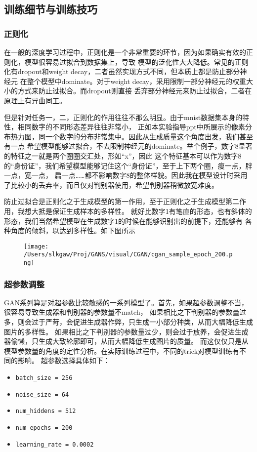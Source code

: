 \documentclass[12pt, a4paper]{article}
\begin{document}
\subsection{训练细节与训练技巧}
\subsubsection{正则化}
在一般的深度学习过程中，正则化是一个非常重要的环节，因为如果确实有效的正则化，模型很容易过拟合到数据集上，导致
模型的泛化性大大降低。常见的正则化有dropout和weight decay，二者虽然实现方式不同，但本质上都是防止部分神经元
在整个模型中dominate。对于weight decay，采用限制一部分神经元的权重大小的方式来防止过拟合。而dropout则直接
丢弃部分神经元来防止过拟合，二者在原理上有异曲同工。

但是针对任务一，二，正则化的作用往往不那么明显。由于mnist数据集本身的特性，相同数字的不同形态差异往往非常小，
正如本实验指导ppt中所展示的像素分布热力图，同一个数字的分布非常集中。因此从生成质量这个角度出发，我们甚至有一点
希望模型能够过拟合，不去限制神经元的dominate。举个例子，数字8显著的特征之一就是两个圈圈交汇处，形如“x”，因此
这个特征基本可以作为数字8的“身份证”，我们希望模型能够记住这个“身份证”，至于上下两个圈，瘦一点，胖一点，宽一点，
扁一点……都不影响数字8的整体样貌。因此我在模型设计时采用了比较小的丢弃率，而且仅对判别器使用，希望判别器稍微放宽难度。

防止过拟合是正则化之于生成模型的第一作用，至于正则化之于生成模型第二作用，我想大抵是保证生成样本的多样性。
就好比数字1有笔直的形态，也有斜体的形态，我们当然希望模型在生成数字1的时候在能够识别出的前提下，还能够有
各种角度的倾斜，以达到多样性。如下图所示

\vspace{1cm}


\begin{figure}[htbp]
    \centering
    \texttt{[image: /Users/slkgaw/Proj/GANS/visual/CGAN/cgan\_sample\_epoch\_200.png]}
\end{figure}

\newpage
\subsubsection{超参数调整}
GAN系列算是对超参数比较敏感的一系列模型了。首先，如果超参数调整不当，很容易导致生成器和判别器的参数量不match，
如果相比之下判别器的参数量过多，则会过于严苛，会促进生成器作弊，只生成一小部分种类，从而大幅降低生成图片的多样性。
如果相比之下判别器的参数量过少，则会过于放养，会促进生成器偷懒，只生成大致轮廓即可，从而大幅降低生成图片的质量。
而这仅仅只是从模型参数量的角度的定性分析。在实际训练过程中，不同的trick对模型训练有不同的影响。
超参数选择具体如下：
\begin{itemize}
    \item \texttt{batch\_size = 256}
    \item \texttt{noise\_size = 64}
    \item \texttt{num\_hiddens = 512}
    \item \texttt{num\_epochs = 200}
    \item \texttt{learning\_rate = 0.0002}
\end{itemize}
\end{document}
